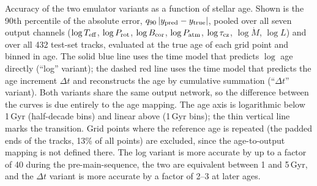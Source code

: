 \caption{Accuracy of the two emulator variants as a function of stellar age.
Shown is the 90th percentile of the absolute error, $q_{90}\,|y_{\rm pred}-y_{\rm true}|$,
pooled over all seven output channels ($\log T_{\rm eff}$, $\log P_{\rm rot}$,
$\log B_{\rm cor}$, $\log P_{\rm atm}$, $\log\tau_{\rm cz}$, $\log\dot M$, $\log L$) and
over all 432 test-set tracks, evaluated at the true age of each grid point and binned
in age. The solid blue line uses the time model that predicts $\log$ age directly
(``log'' variant); the dashed red line uses the time model that predicts the age
increment $\Delta t$ and reconstructs the age by cumulative summation
(``$\Delta t$'' variant). Both variants share the same output network, so the
difference between the curves is due entirely to the age mapping. The age axis is
logarithmic below 1\,Gyr (half-decade bins) and linear above (1\,Gyr bins); the thin
vertical line marks the transition. Grid points where the reference age is repeated
(the padded ends of the tracks, 13\% of all points) are excluded, since the
age-to-output mapping is not defined there. The log variant is more accurate by up to
a factor of 40 during the pre-main-sequence, the two are equivalent between 1 and
5\,Gyr, and the $\Delta t$ variant is more accurate by a factor of 2--3 at later ages.}
